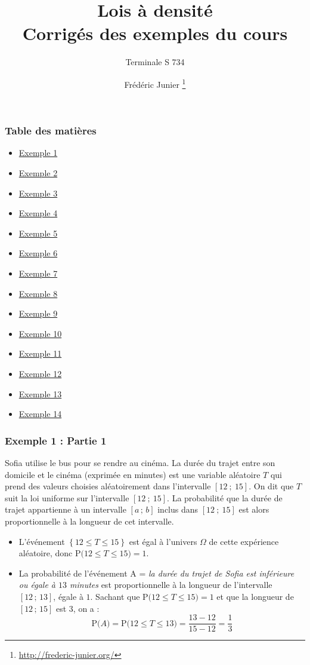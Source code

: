 \documentclass[xcolor=svgnames,t,final]{beamer}
\title{Lois à densité \\ Corrigés des exemples du cours}\subtitle{Terminale S 734}
\author[]{Frédéric Junier \thanks{\url{http://frederic-junier.org/} }}
\institute[Lycée du Parc]{Lycée du Parc, Lyon}
\date[]{}
\newcommand{\Interff}[2]{\left[#1\, ;\, #2\right]}
\newcommand{\proba}[1]{\text{P}\big(#1\big)}
\begin{document}
\frame{\titlepage}


\begin{frame}
\frametitle{Table des matières}
\begin{itemize}
	\item \hyperlink{exemple1}{Exemple 1}
	\item \hyperlink{exemple2}{Exemple 2}
	\item \hyperlink{exemple3}{Exemple 3}
	\item \hyperlink{exemple4}{Exemple 4}
	\item \hyperlink{exemple5}{Exemple 5}
	\item \hyperlink{exemple6}{Exemple 6}
		\item \hyperlink{exemple7}{Exemple 7}
			\item \hyperlink{exemple8}{Exemple 8}
			\item \hyperlink{exemple9}{Exemple 9}
				\item \hyperlink{exemple10}{Exemple 10}
						\item \hyperlink{exemple11}{Exemple 11}
						\item \hyperlink{exemple12}{Exemple 12}
						\item \hyperlink{exemple13}{Exemple 13}
						\item \hyperlink{exemple14}{Exemple 14}
\end{itemize}

\end{frame}



\begin{frame}

\frametitle{Exemple 1 : Partie 1}

\label{exemple1}
Sofia utilise le bus pour se rendre au cinéma.  La durée du trajet entre son domicile et le cinéma (exprimée en minutes) est une variable aléatoire $T$ qui prend des valeurs choisies aléatoirement dans l'intervalle $[12~;~15]$. On dit que $T$ suit la loi uniforme sur l'intervalle $[12~;~15]$. La probabilité que la durée de trajet appartienne à un intervalle $\Interff{a}{b}$ inclus dans $[12~;~15]$ est alors proportionnelle à la longueur de cet intervalle.

\begin{itemize}
\item L'événement $\left\{12 \leqslant  T \leqslant 15\right\}$ est égal à l'univers $\Omega$ de cette expérience aléatoire, donc   $\proba{12 \leqslant T \leqslant 15}=1$.
	\item La probabilité de l'événement A = \og{} \textit{la durée du trajet de Sofia est  inférieure ou égale à $13$ minutes} \fg{} est proportionnelle à la longueur de l'intervalle $\Interff{12}{13}$, égale à $1$. Sachant que $\proba{12 \leqslant T \leqslant 15}=1$ et que la longueur de $\Interff{12}{15}$ est $3$, on a :	
\begin{equation*}
\proba{A}=\proba{12 \leqslant T \leqslant 13}=\frac{13-12}{15-12}=\frac{1}{3}
\end{equation*}


\end{itemize}


\end{frame}
\end{document}
